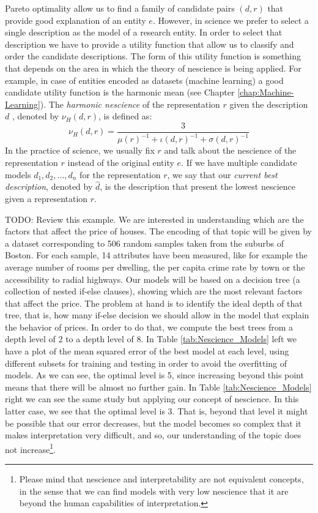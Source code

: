 Pareto optimality allow us to find a family of candidate pairs $(d, r)$ that provide good explanation of an entity $e$. However, in science we prefer to select a single description as the model of a research entity. In order to select that description we have to provide a utility function that allow us to classify and order the candidate descriptions. The form of this utility function is something that depends on the area in which the theory of nescience is being applied. For example, in case of entities encoded as datasets (machine learning) a good candidate utility function is the harmonic mean (see Chapter \ref{chap:Machine-Learning}). The \emph{harmonic nescience} of the representation $r$ given the description $d$ , denoted by $\nu_H\left(d, r\right)$, is defined as:
\[
\nu_H\left(d, r \right) = \frac{3}{ \mu(r)^{-1} + \iota(d, r)^{-1} + \sigma(d, r)^{-1}} 
\]
In the practice of science, we usually fix $r$ and talk about the nescience of the representation $r$ instead of the original entity $e$. If we have multiple candidate models $d_1, d_2, \ldots, d_n$ for the representation $r$, we say that our \emph{current best description}, denoted by $\hat{d}$, is the description that present the lowest nescience given a representation $r$.

\begin{example}
\label{cha1:ex:Boston}
{\color{red} TODO: Review this example.}
We are interested in understanding which are the factors that affect the price of houses. The encoding of that topic will be given by a dataset corresponding to 506 random samples taken from the suburbs of Boston. For each sample, 14 attributes have been measured, like for example the average number of rooms per dwelling, the per capita crime rate by town or the accessibility to radial highways. Our models will be based on a decision tree (a collection of nested if-else clauses), showing which are the most relevant factors that affect the price. The problem at hand is to identify the ideal depth of that tree, that is, how many if-else decision we should allow in the model that explain the behavior of prices. In order to do that, we compute the best trees from a depth level of 2 to a depth level of 8. In Table \ref{tab:Nescience_Models} left we have a plot of the mean squared error of the best model at each level, using different subsets for training and testing in order to avoid the overfitting of models. As we can see, the optimal level is 5, since increasing beyond this point means that there will be almost no further gain. In Table \ref{tab:Nescience_Models} right we can see the same study but applying our concept of nescience. In this latter case, we see that the optimal level is 3. That is, beyond that level it might be possible that our error decreases, but the model becomes so complex that it makes interpretation very difficult, and so, our understanding of the topic does not increase\footnote{Please mind that nescience and interpretability are not equivalent concepts, in the sense that we can find models with very low nescience that it are beyond the human capabilities of interpretation.}.
\end{example}

